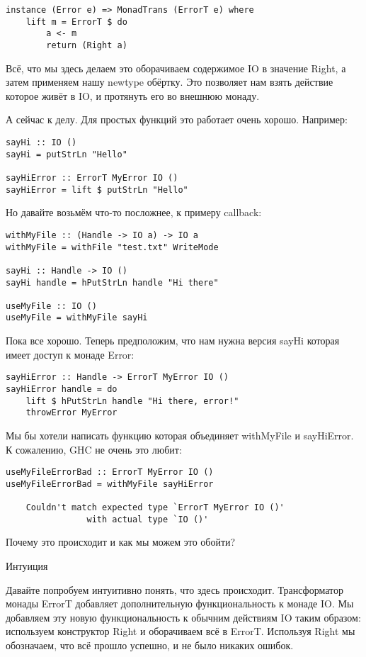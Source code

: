 \begin{lstlisting}
instance (Error e) => MonadTrans (ErrorT e) where
    lift m = ErrorT $ do
        a <- m
        return (Right a)
\end{lstlisting}

Всё, что мы здесь делаем это оборачиваем содержимое IO в значение Right, а затем применяем нашу newtype обёртку. Это позволяет нам взять действие которое живёт в IO, и протянуть его во внешнюю монаду.

А сейчас к делу. Для простых функций это работает очень хорошо. Например:

\begin{lstlisting}
sayHi :: IO ()
sayHi = putStrLn "Hello"

sayHiError :: ErrorT MyError IO ()
sayHiError = lift $ putStrLn "Hello"
\end{lstlisting}

Но давайте возьмём что-то посложнее, к примеру callback:

\begin{lstlisting}
withMyFile :: (Handle -> IO a) -> IO a
withMyFile = withFile "test.txt" WriteMode

sayHi :: Handle -> IO ()
sayHi handle = hPutStrLn handle "Hi there"

useMyFile :: IO ()
useMyFile = withMyFile sayHi
\end{lstlisting}

Пока все хорошо. Теперь предположим, что нам нужна версия sayHi которая имеет доступ к монаде Error:

\begin{lstlisting}
sayHiError :: Handle -> ErrorT MyError IO ()
sayHiError handle = do
    lift $ hPutStrLn handle "Hi there, error!"
    throwError MyError
\end{lstlisting}

Мы бы хотели написать функцию которая объединяет withMyFile и sayHiError. К сожалению, GHC не очень это любит:

\begin{lstlisting}
useMyFileErrorBad :: ErrorT MyError IO ()
useMyFileErrorBad = withMyFile sayHiError

    Couldn't match expected type `ErrorT MyError IO ()'
                with actual type `IO ()'
\end{lstlisting}

Почему это происходит и как мы можем это обойти?

Интуиция

Давайте попробуем интуитивно понять, что здесь происходит. Трансформатор монады ErrorT добавляет дополнительную функциональность к монаде IO. Мы добавляем эту новую функциональность к обычним действиям IO таким образом: используем конструктор Right и оборачиваем всё в ErrorT. Используя Right мы обозначаем, что всё прошло успешно, и не было никаких ошибок.

